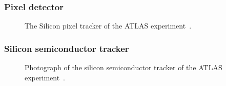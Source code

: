 \FloatBarrier
\subsubsection{Pixel detector} 

\begin{figure}[ht]
  \caption{
    The Silicon pixel tracker of the ATLAS experiment~\cite{Pequenao:1095925}.
  }
  \label{fig:pixel_cartoon}
\end{figure}


\FloatBarrier
\subsubsection{Silicon semiconductor tracker} 

\begin{figure}[ht]
  \caption{
    Photograph of the silicon semiconductor tracker of the ATLAS
    experiment~\cite{Maximilien:883305}.
  }
  \label{fig:sct_photo}
\end{figure}


